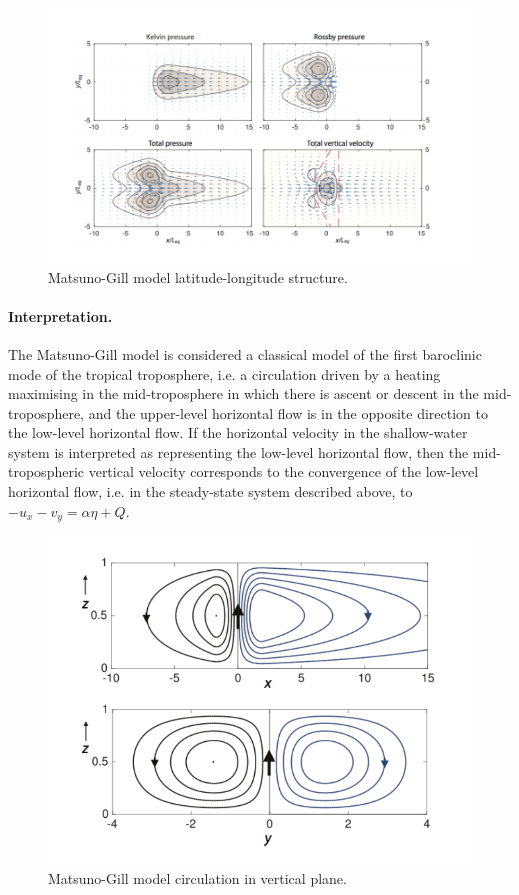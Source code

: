 \documentclass{jknotes}
\begin{document}
\begin{figure}
	\centering
	\includegraphics[width=.9\textwidth]{mglatlong.png}
	\caption{Matsuno-Gill model latitude-longitude structure.}
\end{figure}

\paragraph{Interpretation.} The Matsuno-Gill model is considered a classical
model of the first baroclinic mode of the tropical troposphere, i.e. a
circulation driven by a heating maximising in the mid-troposphere in which
there is ascent or descent in the mid-troposphere, and the upper-level
horizontal flow is in the opposite direction to the low-level horizontal flow.
If the horizontal velocity in the shallow-water system is interpreted as
representing the low-level horizontal flow, then the mid-tropospheric vertical
velocity corresponds to the convergence of the low-level horizontal flow, i.e.
in the steady-state system described above, to $-u_x -v_y = \alpha \eta + Q$. 

\begin{figure}
	\centering
	\includegraphics[width=.6\textwidth]{mgvert.png}
	\caption{Matsuno-Gill model circulation in vertical plane.}
\end{figure}
\end{document}
